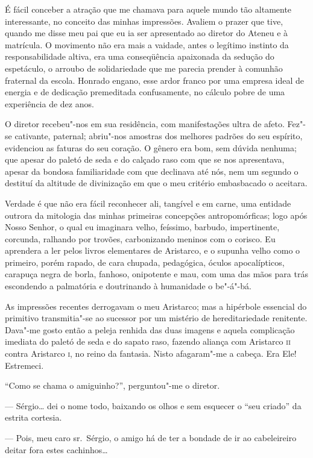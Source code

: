 É fácil conceber a atração que me chamava para aquele mundo
tão altamente interessante, no conceito das minhas impressões. Avaliem
o prazer que tive, quando me disse meu pai que eu ia ser apresentado ao
diretor do Ateneu e à matrícula. O movimento não era mais a vaidade,
antes o legítimo instinto da responsabilidade altiva, era uma
conseqüência apaixonada da sedução do espetáculo, o arroubo de
solidariedade que me parecia prender à comunhão fraternal da escola.
Honrado engano, esse ardor franco por uma empresa ideal de energia e de
dedicação premeditada confusamente, no cálculo pobre de uma experiência
de dez anos. 

O diretor recebeu"-nos em sua residência, com
manifestações ultra de afeto. Fez"-se cativante, paternal; abriu"-nos
amostras dos melhores padrões do seu espírito, evidenciou as faturas do
seu coração. O gênero era bom, sem dúvida nenhuma; que apesar do paletó
de seda e do calçado raso com que se nos apresentava, apesar da bondosa
familiaridade com que declinava até nós, nem um segundo o destituí da
altitude de divinização em que o meu critério embasbacado o aceitara.

Verdade é que não era fácil reconhecer ali, tangível e em carne, uma
entidade outrora da mitologia das minhas primeiras concepções
antropomórficas; logo após Nosso Senhor, o qual eu imaginara velho,
feíssimo, barbudo, impertinente, corcunda, ralhando por trovões,
carbonizando meninos com o corisco. Eu aprendera a ler pelos livros
elementares de Aristarco, e o supunha velho como o primeiro, porém
rapado, de cara chupada, pedagógica, óculos apocalípticos, carapuça
negra de borla, fanhoso, onipotente e mau, com uma das mãos para trás
escondendo a palmatória e doutrinando à humanidade o be"-á"-bá. 

As impressões recentes derrogavam o meu Aristarco; mas a hipérbole
essencial do primitivo transmitia"-se ao sucessor por um mistério de
hereditariedade renitente. Dava"-me gosto então a peleja renhida das
duas imagens e aquela complicação imediata do paletó de seda e do
sapato raso, fazendo aliança com Aristarco \textsc{ii} contra Aristarco \textsc{i}, no
reino da fantasia. Nisto afagaram"-me a cabeça. Era Ele! Estremeci.

``Como se chama o amiguinho?'', perguntou"-me o diretor. 

--- Sérgio\ldots{} dei o nome todo, baixando os olhos e sem esquecer o ``seu criado'' da
estrita cortesia. 

--- Pois, meu caro sr.~Sérgio, o amigo há de ter a
bondade de ir ao cabeleireiro deitar fora estes cachinhos\ldots{} 

